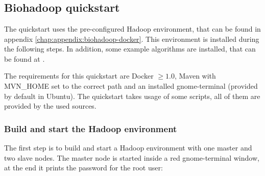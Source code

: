 \appendix
\addappheadtotoc

\chapter{}

% 

% 
% 
% 

\section{Biohadoop quickstart}
\label{chap:appendix:biohadoop-quickstart}
The quickstart uses the pre-configured Hadoop environment, that can be found in appendix \ref{chap:appendix:biohadoop-docker}. This environment is installed during the following steps. In addition, some example algorithms are installed, that can be found at \cite{biohadoop-algorithms}. 

The requirements for this quickstart are Docker $\geq 1.0$, Maven with MVN\_HOME set to the correct path and an installed gnome-terminal (provided by default in Ubuntu). The quickstart takes usage of some scripts, all of them are provided by the used sources.

\subsection{Build and start the Hadoop environment}
The first step is to build and start a Hadoop environment with one master and two slave nodes. The master node is started inside a red gnome-terminal window, at the end it prints the password for the root user:

